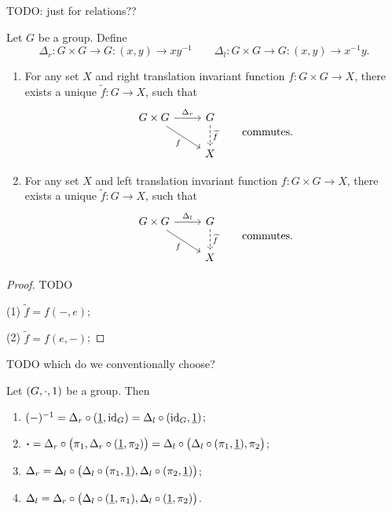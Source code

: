 TODO: just for relations??
\begin{proposition}
Let $G$ be a group. Define
\[ \Delta_r:G\times G\to G: (x,y) \to xy^{-1} \qquad \Delta_l:G\times G\to G: (x,y) \to x^{-1}y. \]
\begin{enumerate}
\item For any set $X$ and right translation invariant function $f:G\times G\to X$, there exists a unique $\widetilde{f}: G\to X$, such that
\[ \begin{tikzcd}
G\times G \rar{\Delta_r} \ar[dr, swap, "{f}"] & G \dar[dashed]{\widetilde{f}} \\
 & X
\end{tikzcd} \qquad\text{commutes.} \]
\item For any set $X$ and left translation invariant function $f:G\times G\to X$, there exists a unique $\widetilde{f}: G\to X$, such that
\[ \begin{tikzcd}
G\times G \rar{\Delta_l} \ar[dr, swap, "{f}"] & G \dar[dashed]{\widetilde{f}} \\
 & X
\end{tikzcd} \qquad\text{commutes.} \]
\end{enumerate}
\end{proposition}
\begin{proof}
TODO

(1) $\widetilde{f} = f(-, e)$;

(2) $\widetilde{f} = f(e, -)$;
\end{proof}

TODO which do we conventionally choose?

\begin{lemma} \label{leftToRightTranslationInvarianceLemma}
Let $\left( G, \cdot, 1 \right)$ be a group. Then
\begin{enumerate}
\item $(-)^{-1} = \Delta_r\circ(\underline{1}, \operatorname{id}_G) = \Delta_l\circ (\operatorname{id}_G, \underline{1})$;
\item $\boldsymbol{\cdot} = \Delta_r\circ \big(\pi_1, \Delta_r\circ(\underline{1}, \pi_2)\big) = \Delta_l\circ \big(\Delta_l\circ(\pi_1, \underline{1}), \pi_2\big)$;
\item $\Delta_r = \Delta_l\circ \big(\Delta_l\circ (\pi_1, \underline{1}), \Delta_l\circ (\pi_2, \underline{1}) \big)$;
\item $\Delta_l = \Delta_r\circ \big(\Delta_l\circ (\underline{1},\pi_1), \Delta_l\circ (\underline{1}, \pi_2) \big)$.
\end{enumerate}
\end{lemma}

